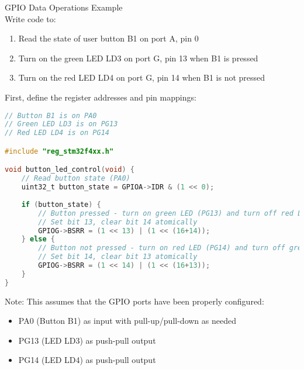 \begin{example2}{GPIO Data Operations Example}\\
Write code to:
\begin{enumerate}
    \item Read the state of user button B1 on port A, pin 0
    \item Turn on the green LED LD3 on port G, pin 13 when B1 is pressed
    \item Turn on the red LED LD4 on port G, pin 14 when B1 is not pressed
\end{enumerate}

\tcblower
First, define the register addresses and pin mappings:

\begin{lstlisting}[language=C, style=basesmol]
// Button B1 is on PA0
// Green LED LD3 is on PG13
// Red LED LD4 is on PG14

#include "reg_stm32f4xx.h"

void button_led_control(void) {
    // Read button state (PA0)
    uint32_t button_state = GPIOA->IDR & (1 << 0);
    
    if (button_state) {
        // Button pressed - turn on green LED (PG13) and turn off red LED (PG14)
        // Set bit 13, clear bit 14 atomically
        GPIOG->BSRR = (1 << 13) | (1 << (16+14));
    } else {
        // Button not pressed - turn on red LED (PG14) and turn off green LED (PG13)
        // Set bit 14, clear bit 13 atomically
        GPIOG->BSRR = (1 << 14) | (1 << (16+13));
    }
}
\end{lstlisting}

Note: This assumes that the GPIO ports have been properly configured:
\begin{itemize}
    \item PA0 (Button B1) as input with pull-up/pull-down as needed
    \item PG13 (LED LD3) as push-pull output
    \item PG14 (LED LD4) as push-pull output
\end{itemize}
\end{example2}